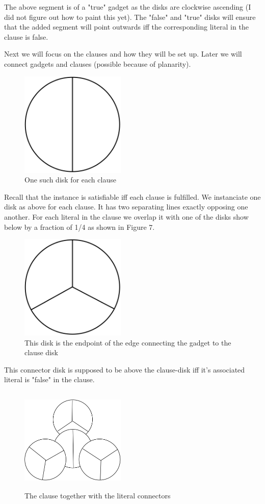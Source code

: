 \documentclass[a4paper,11pt]{article}
\begin{document}
The above segment is of a "true" gadget as the disks are clockwise ascending (I did not figure out how to paint this yet). The "false" and "true" disks will ensure that the added segment will point outwards iff the corresponding literal in the clause is false.

Next we will focus on the clauses and how they will be set up. Later we will connect gadgets and clauses (possible because of planarity).

\begin{figure}[h]
\centering
\includegraphics[width=5cm, height=5cm]{assets/np-hardness/clause.png}
\caption{One such disk for each clause}
\end{figure}

Recall that the instance is satisfiable iff each clause is fulfilled. We instanciate one disk as above for each clause. It has two separating lines exactly opposing one another. For each literal in the clause we overlap it with one of the disks show below by a fraction of 1/4 as shown in Figure 7.

\begin{figure}[h]
\centering
\includegraphics[width=5cm, height=5cm]{assets/np-hardness/clause_connector.png}
\caption{This disk is the endpoint of the edge connecting the gadget to the clause disk}
\end{figure}

This connector disk is supposed to be above the clause-disk iff it's associated literal is "false" in the clause.

\begin{figure}[h]
\centering
\includegraphics[width=5cm, height=5cm]{assets/np-hardness/literal_clause.png}
\caption{The clause together with the literal connectors}
\end{figure}
\end{document}
